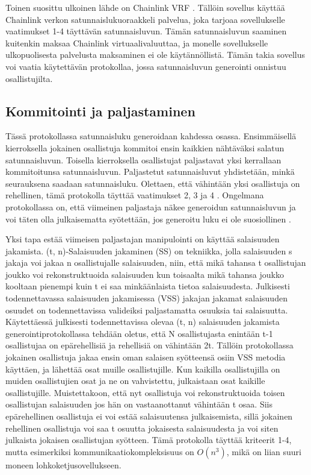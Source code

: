 \documentclass{article}
\begin{document}
Toinen suosittu ulkoinen lähde on Chainlink VRF \cite{noauthor_verifiable_2020}. Tällöin sovellus käyttää Chainlink verkon satunnaislukuoraakkeli palvelua, joka tarjoaa sovellukselle vaatimukset 1-4 täyttävän satunnaisluvun. Tämän satunnaisluvun saaminen kuitenkin maksaa Chainlink virtuaalivaluuttaa, ja monelle sovellukselle ulkopuolisesta palvelusta maksaminen ei ole käytännöllistä. Tämän takia sovellus voi vaatia käytettävän protokollaa, jossa satunnaisluvun generointi onnistuu osallistujilta.

\subsection{Kommitointi ja paljastaminen}
Tässä protokollassa satunnaisluku generoidaan kahdessa osassa. Ensimmäisellä kierroksella jokainen osallistuja kommitoi ensin kaikkien nähtäväksi salatun satunnaisluvun. Toisella kierroksella osallistujat paljastavat yksi kerrallaan kommitoitunsa satunnaisluvun. Paljastetut satunnaisluvut yhdistetään, minkä seurauksena saadaan satunnaisluku. Olettaen, että vähintään yksi osallistuja on rehellinen, tämä protokolla täyttää vaatimukset 2, 3 ja 4 \cite{simic_review_2020}. Ongelmana protokollassa on, että viimeinen paljastaja näkee generoidun satunnaisluvun ja voi täten olla julkaisematta syötettään, jos generoitu luku ei ole suosiollinen \cite{simic_review_2020}.

Yksi tapa estää viimeisen paljastajan manipulointi on käyttää salaisuuden jakamista. (t, n)-Salaisuuden jakaminen (SS) on tekniikka, jolla salaisuuden s jakaja voi jakaa n osallistujalle salaisuuden, niin, että mikä tahansa t osallistujan joukko voi rekonstruktuoida salaisuuden kun toisaalta mikä tahansa joukko kooltaan pienempi kuin t ei saa minkäänlaista tietoa salaisuudesta\cite{syta_scalable_2017}. Julkisesti todennettavassa salaisuuden jakamisessa (VSS) jakajan jakamat salaisuuden osuudet on todennettavissa valideiksi paljastamatta osuuksia tai salaisuutta. Käytettäessä julkisesti todennettavissa olevaa (t, n) salaisuuden jakamista generointiprotokollassa tehdään oletus, että N osallistujasta enintään t-1 osallistujaa on epärehellisiä ja rehellisiä on vähintään 2t. Tällöin protokollassa jokainen osallistuja jakaa ensin oman salaisen syötteensä osiin VSS metodia käyttäen, ja lähettää osat muille osallistujille. Kun kaikilla osallistujilla on muiden osallistujien osat ja ne on vahvistettu, julkaistaan osat kaikille osallistujille. Muistettakoon, että nyt osallistuja voi rekonstruktuoida toisen osallistujan salaisuuden jos hän on vastaanottanut vähintään t osaa. Siis epärehellinen osallistuja ei voi estää salaisuutensa julkaisemista, sillä jokainen rehellinen osallistuja voi saa t osuutta jokaisesta salaisuudesta ja voi siten julkaista jokaisen osallistujan syötteen. Tämä protokolla täyttää kriteerit 1-4, mutta esimerkiksi kommunikaatiokompleksisuus on $O(n^3)$, mikä on liian suuri moneen lohkoketjusovellukseen.
\end{document}
